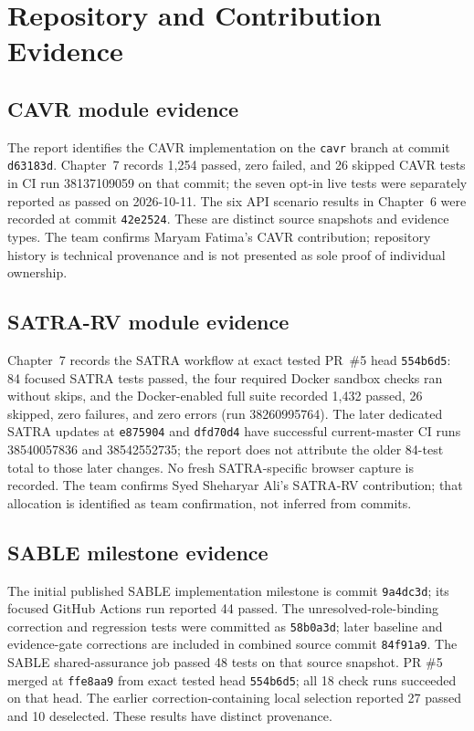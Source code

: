 \chapter{Repository and Contribution Evidence}
\section*{CAVR module evidence}
The report identifies the CAVR implementation on the \texttt{cavr} branch at commit \texttt{d63183d}. Chapter~7 records 1,254 passed, zero failed, and 26 skipped CAVR tests in CI run 38137109059 on that commit; the seven opt-in live tests were separately reported as passed on 2026-10-11. The six API scenario results in Chapter~6 were recorded at commit \texttt{42e2524}. These are distinct source snapshots and evidence types. The team confirms Maryam Fatima's CAVR contribution; repository history is technical provenance and is not presented as sole proof of individual ownership.

\section*{SATRA-RV module evidence}
Chapter~7 records the SATRA workflow at exact tested PR~\#5 head \texttt{554b6d5}: 84 focused SATRA tests passed, the four required Docker sandbox checks ran without skips, and the Docker-enabled full suite recorded 1,432 passed, 26 skipped, zero failures, and zero errors (run 38260995764). The later dedicated SATRA updates at \texttt{e875904} and \texttt{dfd70d4} have successful current-master CI runs 38540057836 and 38542552735; the report does not attribute the older 84-test total to those later changes. No fresh SATRA-specific browser capture is recorded. The team confirms Syed Sheharyar Ali's SATRA-RV contribution; that allocation is identified as team confirmation, not inferred from commits.

\section*{SABLE milestone evidence}
The initial published SABLE implementation milestone is commit \texttt{9a4dc3d}; its focused GitHub Actions run reported 44 passed. The unresolved-role-binding correction and regression tests were committed as \texttt{58b0a3d}; later baseline and evidence-gate corrections are included in combined source commit \texttt{84f91a9}. The SABLE shared-assurance job passed 48 tests on that source snapshot. PR \#5 merged at \texttt{ffe8aa9} from exact tested head \texttt{554b6d5}; all 18 check runs succeeded on that head. The earlier correction-containing local selection reported 27 passed and 10 deselected. These results have distinct provenance.


